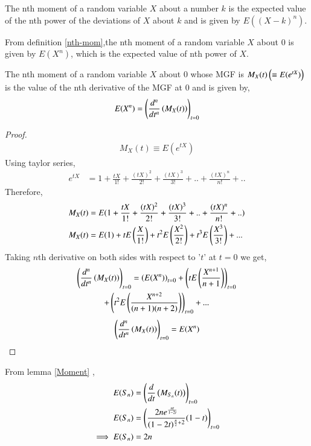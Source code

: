 \documentclass[journal,12pt,twocolumn]{IEEEtran}
\begin{document}
\newpage

\begin{definition}
 The nth moment of a random variable $X$ about a number $k$ is the expected value of the nth power of the deviations of $X$ about $k$ and is given by $E((X-k)^{n})$.
 
 \label{nth-mom}
\end{definition}
From definition \ref{nth-mom},the nth moment of a random variable $X$ about $0$ is given by $E(X^{n})$, which is the expected value of nth power of $X$.
\begin{lemma}
 The nth moment of a random variable $X$ about $0$ whose MGF is $M_{X}(t)\left(\equiv E(e^{tX})\right)$ is the value of the nth derivative of the MGF at $0$ and is given by,
 \begin{align}
     E(X^{n})=\left(\frac{d^{n}}{dt^{n}}\left(M_{X}(t)\right)\right)_{t=0}
     \label{4}
 \end{align}
 \label{Moment}
\end{lemma}
\begin{proof}
\begin{align}
    M_{X}(t)\equiv E(e^{tX})
\end{align}
Using taylor series,
\begin{align}
e^{tX}&=1+\frac{tX}{1!}+\frac{(tX)^2}{2!}+\frac{(tX)^3}{3!}+..+\frac{(tX)^n}{n!}+..
\end{align}
Therefore,
\begin{align}
 M_{X}(t)&=E(1+\frac{tX}{1!}+\frac{(tX)^2}{2!}+\frac{(tX)^3}{3!}+..+\frac{(tX)^n}{n!}+..)
 \\M_{X}(t)&=E(1)+tE\left(\frac{X}{1!}\right)+t^{2}E\left(\frac{X^2}{2!}\right)+t^3E\left(\frac{X^3}{3!}\right)+...
\end{align}
Taking $n$th derivative  on both sides with respect to '$t$' at $t=0$ we get,
\begin{multline}
\left(\frac{d^{n}}{dt^{n}}\left(M_{X}(t)\right)\right)_{t=0}=\left(E(X^n)\right)_{t=0}+\left(tE\left(\frac{X^{n+1}}{n+1}\right)\right)_{t=0}\\
+\left(t^2E\left(\frac{X^{n+2}}{(n+1)(n+2)}\right)\right)_{t=0}+...
\end{multline}
\begin{align}
    \left(\frac{d^{n}}{dt^{n}}\left(M_{X}(t)\right)\right)_{t=0}=E(X^{n})
\end{align}
\end{proof}
From lemma \ref{Moment} ,
\begin{align}
 E(S_{n})&=\left(\frac{d}{dt}\left(M_{S_{n}}(t)\right)\right)_{t=0}
\\E(S_{n})&=\left(\frac{2ne^{\frac{nt}{1-2t}}}{(1-2t)^{\frac{n}{2}+2}}(1-t)\right)_{t=0}
\\\implies  E(S_{n})&=2n \label{2}
\end{align}
\end{document}
